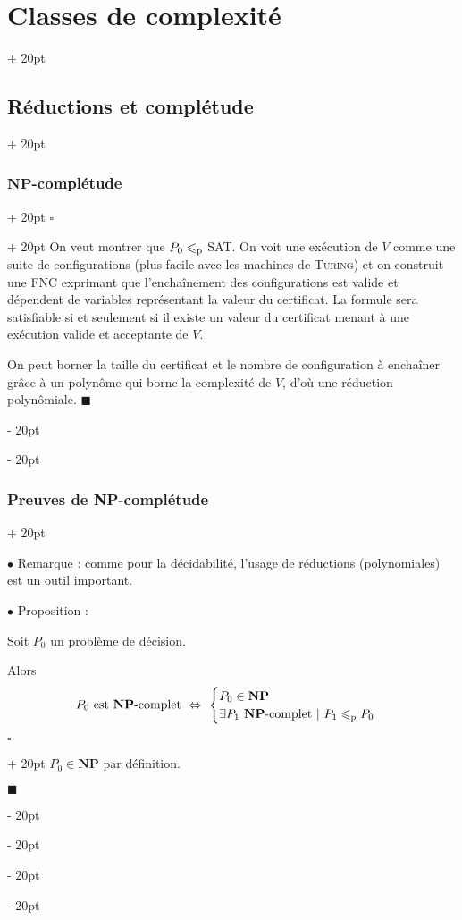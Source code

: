 \documentclass[a4paper, 12pt, twoside]{article}
\newcommand{\ssi}{\ \Leftrightarrow \ }
\renewcommand{\le}{\leqslant}
\newcommand{\ind}[1][20pt]{\advance\leftskip + #1}
\newcommand{\deind}[1][20pt]{\advance\leftskip - #1}
\newenvironment{indt}[2][20pt]{#2 \par \ind[#1]}{\par \deind} %
\newenvironment{proof}[1][{}]{\begin{indt}{$\square$ #1}}{$\blacksquare$ \end{indt}}
\begin{document}
\begin{indt}{\section{Classes de complexité}}
\begin{indt}{\subsection{Réductions et complétude}}
\begin{indt}{\subsubsection{$\mathbf{NP}$-complétude}}
\begin{proof}
                    On veut montrer que $P_0 \le_{\rm p}$ SAT. On voit une exécution de $V$ comme une suite de configurations (plus facile avec les machines de \textsc{Turing}) et on construit une FNC exprimant que l'enchaînement des configurations est valide et dépendent de variables représentant la valeur du certificat. La formule sera satisfiable si et seulement si il existe un valeur du certificat menant à une exécution valide et acceptante de $V$.

                    On peut borner la taille du certificat et le nombre de configuration à enchaîner grâce à un polynôme qui borne la complexité de $V$, d'où une réduction polynômiale.
                \end{proof}
            \end{indt}

            \vspace{12pt}
            
            \begin{indt}{\subsubsection{Preuves de \textbf{NP}-complétude}}
                \label{2.3.3}

                $\bullet$ Remarque : comme pour la décidabilité, l'usage de réductions (polynomiales) est un outil important.

                \vspace{12pt}
                
                $\bullet$ Proposition :
                \begin{emphBox}
                    Soit $P_0$ un problème de décision.
                    
                    Alors
                    \[
                        P_0\ \text{est \textbf{NP}-complet}
                        \ssi
                        \begin{cases}
                            P_0 \in \mathbf{NP}
                            \\
                            \exists P_1 \ \text{\textbf{NP}-complet}\ |\ P_1 \le_{\rm p} P_0
                        \end{cases}
                    \]
                \end{emphBox}

                \begin{proof}
                    \boxed{\Rightarrow} $P_0 \in \mathbf{NP}$ par définition.


\end{proof}
\end{indt}
\end{indt}
\end{indt}
\end{document}
